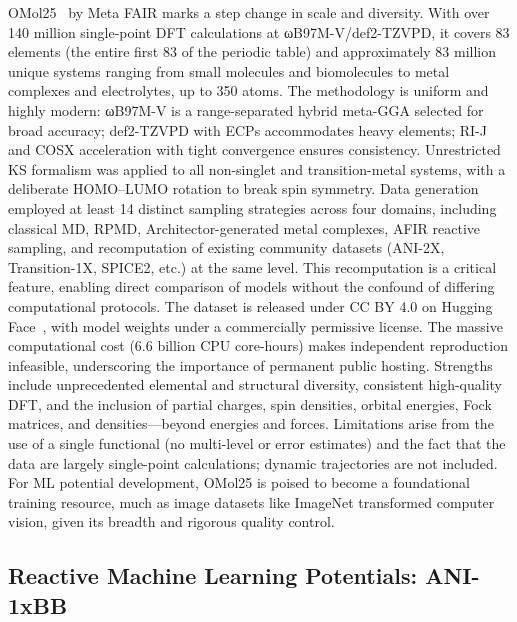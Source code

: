 \documentclass[12pt]{article}
\begin{document}
OMol25~\cite{ds45-1} by Meta FAIR marks a step change in scale and diversity. With over 140 million single-point DFT calculations at ωB97M-V/def2-TZVPD, it covers 83 elements (the entire first 83 of the periodic table) and approximately 83 million unique systems ranging from small molecules and biomolecules to metal complexes and electrolytes, up to 350 atoms. The methodology is uniform and highly modern: ωB97M-V is a range-separated hybrid meta-GGA selected for broad accuracy; def2-TZVPD with ECPs accommodates heavy elements; RI-J and COSX acceleration with tight convergence ensures consistency. Unrestricted KS formalism was applied to all non-singlet and transition-metal systems, with a deliberate HOMO–LUMO rotation to break spin symmetry. Data generation employed at least 14 distinct sampling strategies across four domains, including classical MD, RPMD, Architector-generated metal complexes, AFIR reactive sampling, and recomputation of existing community datasets (ANI-2X, Transition-1X, SPICE2, etc.) at the same level. This recomputation is a critical feature, enabling direct comparison of models without the confound of differing computational protocols. The dataset is released under CC BY 4.0 on Hugging Face~\cite{ds45-6}, with model weights under a commercially permissive license. The massive computational cost (6.6 billion CPU core-hours) makes independent reproduction infeasible, underscoring the importance of permanent public hosting. Strengths include unprecedented elemental and structural diversity, consistent high-quality DFT, and the inclusion of partial charges, spin densities, orbital energies, Fock matrices, and densities—beyond energies and forces. Limitations arise from the use of a single functional (no multi-level or error estimates) and the fact that the data are largely single-point calculations; dynamic trajectories are not included. For ML potential development, OMol25 is poised to become a foundational training resource, much as image datasets like ImageNet transformed computer vision, given its breadth and rigorous quality control.

\subsection{Reactive Machine Learning Potentials: ANI-1xBB}
\end{document}
